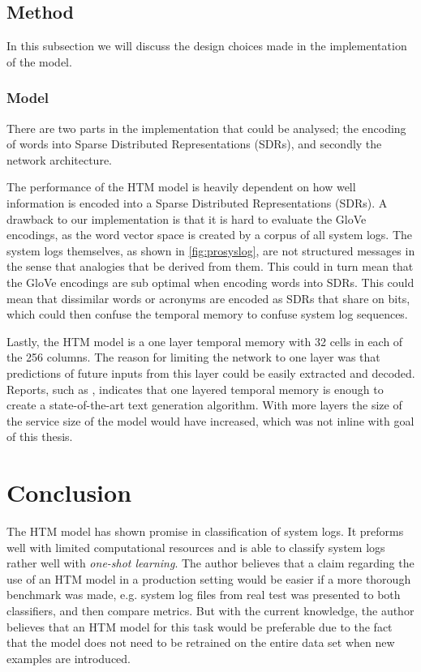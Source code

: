 \subsection{Method}
In this subsection we will discuss the design choices made in the implementation of the model. 

\subsubsection{Model}
There are two parts in the implementation that could be analysed; the encoding of words into Sparse Distributed Representations (SDRs), and secondly the network architecture. 

The performance of the HTM model is heavily dependent on how well information is encoded into a Sparse Distributed Representations (SDRs). A drawback to our implementation is that it is hard to evaluate the GloVe encodings, as the word vector space is created by a corpus of all system logs. The system logs themselves, as shown in \autoref{fig:prosyslog}, are not structured messages in the sense that analogies that be derived from them. This could in turn mean that the GloVe encodings are sub optimal when encoding words into SDRs. This could mean that dissimilar words or acronyms are encoded as SDRs that share on bits, which could then confuse the temporal memory to confuse system log sequences. 


Lastly, the HTM model is a one layer temporal memory with 32 cells in each of the 256 columns. The reason for limiting the network to one layer was that predictions of future inputs from this layer could be easily extracted and decoded. Reports, such as \cite{7844355}, indicates that one layered temporal memory is enough to create a state-of-the-art text generation algorithm. With more layers the size of the service size of the model would have increased, which was not inline with goal of this thesis.






\section{Conclusion}
The HTM model has shown promise in classification of system logs. It preforms well with limited computational resources and is able to classify system logs rather well with \textit{one-shot learning}. The author believes that a claim regarding the use of an HTM model in a production setting would be easier if a more thorough benchmark was made, e.g. system log files from real test was presented to both classifiers, and then compare metrics. But with the current knowledge, the author believes that an HTM model for this task would be preferable due to the fact that the model does not need to be retrained on the entire data set when new examples are introduced. 






